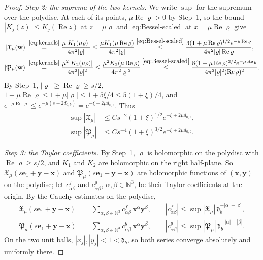 \documentclass[11pt]{amsart}
\numberwithin{equation}{section}
\theoremstyle{definition}
\newcommand{\N}{\mathbb N}
\newcommand{\bx}{\mathbf x}
\newcommand{\by}{\mathbf y}
\newcommand{\eone}{\mathbf e_1}
\newcommand{\Rea}{\operatorname{Re}}
\begin{document}
\begin{proof}
\smallskip
\emph{Step 2: the suprema of the two kernels.}
We write \(\sup\) for the supremum over the polydisc. At each of its
points, \(\mu\Rea\varrho>0\) by Step~1, so the bound
\(|K_j(z)|\le K_j(\Rea z)\) at \(z=\mu\varrho\) and
\eqref{eq:Bessel-scaled} at \(x=\mu\Rea\varrho\) give
\[
 \begin{split}
 |\mathfrak X_\mu(\mathbf w)|
 &\overset{\eqref{eq:kernels}}{=}
 \frac{\mu|K_1(\mu\varrho)|}{4\pi^2|\varrho|}
 \le\frac{\mu K_1(\mu\Rea\varrho)}{4\pi^2|\varrho|}
 \overset{\eqref{eq:Bessel-scaled}}{\le}
 \frac{3(1+\mu\Rea\varrho)^{1/2}e^{-\mu\Rea\varrho}}
 {4\pi^2|\varrho|\Rea\varrho},\\
 |\mathfrak P_\mu(\mathbf w)|
 &\overset{\eqref{eq:kernels}}{=}
 \frac{\mu^2|K_2(\mu\varrho)|}{4\pi^2|\varrho|^2}
 \le\frac{\mu^2K_2(\mu\Rea\varrho)}{4\pi^2|\varrho|^2}
 \overset{\eqref{eq:Bessel-scaled}}{\le}
 \frac{8(1+\mu\Rea\varrho)^{3/2}e^{-\mu\Rea\varrho}}
 {4\pi^2|\varrho|^2(\Rea\varrho)^2}.
 \end{split}
\]
By Step~1, \(|\varrho|\ge\Rea\varrho\ge s/2\),
\(1+\mu\Rea\varrho\le1+\mu|\varrho|\le1+5\xi/4\le5(1+\xi)/4\), and
\(e^{-\mu\Rea\varrho}\le e^{-\mu(s-2d_{0,b})}=e^{-\xi+2\mu d_{0,b}}\).
Thus
\[
 \begin{split}
 \sup|\mathfrak X_\mu|
 &\le Cs^{-2}(1+\xi)^{1/2}e^{-\xi+2\mu d_{0,b}},\\
 \sup|\mathfrak P_\mu|
 &\le Cs^{-4}(1+\xi)^{3/2}e^{-\xi+2\mu d_{0,b}}.
 \end{split}
\]

\smallskip
\emph{Step 3: the Taylor coefficients.}
By Step~1, \(\varrho\) is holomorphic on the polydisc with
\(\Rea\varrho\ge s/2\), and \(K_1\) and \(K_2\) are holomorphic on the
right half-plane. So \(\mathfrak X_\mu(s\eone+\by-\bx)\) and
\(\mathfrak P_\mu(s\eone+\by-\bx)\) are holomorphic functions of
\((\bx,\by)\) on the polydisc; let \(c^f_{\alpha\beta}\) and
\(c^g_{\alpha\beta}\), \(\alpha,\beta\in\N^3\), be their Taylor
coefficients at the origin. By the Cauchy estimates on the polydisc,
\[
 \begin{split}
 \mathfrak X_\mu(s\eone+\by-\bx)
 &=\sum_{\alpha,\beta\in\N^3}c^f_{\alpha\beta}\,\bx^\alpha\by^\beta,
 \qquad
 |c^f_{\alpha\beta}|
 \le\sup|\mathfrak X_\mu|\,\mathfrak d_b^{-|\alpha|-|\beta|},\\
 \mathfrak P_\mu(s\eone+\by-\bx)
 &=\sum_{\alpha,\beta\in\N^3}c^g_{\alpha\beta}\,\bx^\alpha\by^\beta,
 \qquad
 |c^g_{\alpha\beta}|
 \le\sup|\mathfrak P_\mu|\,\mathfrak d_b^{-|\alpha|-|\beta|}.
 \end{split}
\]
On the two unit balls, \(|x_j|,|y_j|<1<\mathfrak d_b\), so both series
converge absolutely and uniformly there.


\end{proof}
\end{document}
